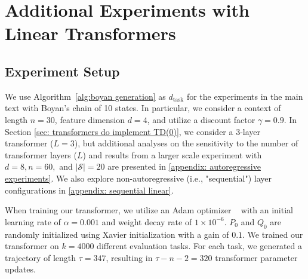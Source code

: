 \documentclass{article}
\begin{document}
\newpage

\section{Additional Experiments with Linear Transformers} \label{appendix: additional linear}
\subsection{Experiment Setup} \label{appendix: experiment setup}

We use Algorithm~\ref{alg:boyan generation} as $d_\text{task}$ for the experiments in the main text with Boyan's chain of 10 states.
In particular, 
we consider a context of length $n=30$, feature dimension $d=4$, and utilize a discount factor $\gamma = 0.9$. In Section \ref{sec: transformers do implement TD(0)}, we consider a 3-layer transformer ($L=3$), but additional analyses on the sensitivity to the number of transformer layers ($L$) and results from a larger scale experiment with $d=8, n=60,$ and $|\mathcal{S}|=20$ are presented in \ref{appendix: autoregressive experiments}. We also explore non-autoregressive (i.e., "sequential") layer configurations in \ref{appendix: sequential linear}.

When training our transformer, we utilize an Adam optimizer ~\citep{kingma2014adam} with an initial learning rate of $\alpha = 0.001$ and weight decay rate of $1\times 10^{-6}$. $P_0$ and $Q_0$ are randomly initialized using Xavier initialization with a gain of $0.1$. 
We trained our transformer on $k=4000$ different evaluation tasks.
For each task, we generated a trajectory of length $\tau = 347$, resulting in $\tau - n -2 = 320$ transformer parameter updates.
\end{document}
